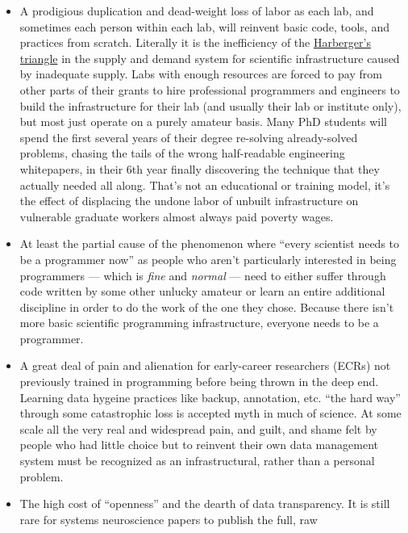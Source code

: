 \documentclass{article}
\begin{document}
\begin{itemize}

\item
  A prodigious duplication and dead-weight loss of labor as each lab,
  and sometimes each person within each lab, will reinvent basic code,
  tools, and practices from scratch. Literally it is the inefficiency of
  the
  \href{https://en.wikipedia.org/wiki/Deadweight_loss\#Harberger's_triangle}{Harberger's
  triangle} in the supply and demand system for scientific
  infrastructure caused by inadequate supply. Labs with enough resources
  are forced to pay from other parts of their grants to hire
  professional programmers and engineers to build the infrastructure for
  their lab (and usually their lab or institute only), but most just
  operate on a purely amateur basis. Many PhD students will spend the
  first several years of their degree re-solving already-solved
  problems, chasing the tails of the wrong half-readable engineering
  whitepapers, in their 6th year finally discovering the technique that
  they actually needed all along. That's not an educational or training
  model, it's the effect of displacing the undone labor of unbuilt
  infrastructure on vulnerable graduate workers almost always paid
  poverty wages.
\item
  At least the partial cause of the phenomenon where ``every scientist
  needs to be a programmer now'' as people who aren't particularly
  interested in being programmers --- which is \emph{fine} and
  \emph{normal} --- need to either suffer through code written by some
  other unlucky amateur or learn an entire additional discipline in
  order to do the work of the one they chose. Because there isn't more
  basic scientific programming infrastructure, everyone needs to be a
  programmer.
\item
  A great deal of pain and alienation for early-career researchers
  (ECRs) not previously trained in programming before being thrown in
  the deep end. Learning data hygeine practices like backup, annotation,
  etc. ``the hard way'' through some catastrophic loss is accepted myth
  in much of science. At some scale all the very real and widespread
  pain, and guilt, and shame felt by people who had little choice but to
  reinvent their own data management system must be recognized as an
  infrastructural, rather than a personal problem.
\item
  The high cost of ``openness'' and the dearth of data transparency. It
  is still rare for systems neuroscience papers to publish the full, raw

\end{itemize}
\end{document}
